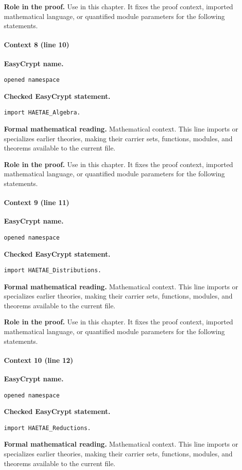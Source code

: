 \noindent\textbf{Role in the proof.}
Use in this chapter. It fixes the proof context, imported mathematical language, or quantified module parameters for the following statements.

\paragraph{Context 8 (line 10)}
\noindent\textbf{EasyCrypt name.}
\begin{lstlisting}[language=EasyCrypt,basicstyle=\ttfamily\scriptsize]
opened namespace
\end{lstlisting}
\noindent\textbf{Checked EasyCrypt statement.}
\begin{lstlisting}[language=EasyCrypt,basicstyle=\ttfamily\scriptsize]
import HAETAE_Algebra.
\end{lstlisting}
\noindent\textbf{Formal mathematical reading.}
Mathematical context. This line imports or specializes earlier theories, making their carrier sets, functions, modules, and theorems available to the current file.

\noindent\textbf{Role in the proof.}
Use in this chapter. It fixes the proof context, imported mathematical language, or quantified module parameters for the following statements.

\paragraph{Context 9 (line 11)}
\noindent\textbf{EasyCrypt name.}
\begin{lstlisting}[language=EasyCrypt,basicstyle=\ttfamily\scriptsize]
opened namespace
\end{lstlisting}
\noindent\textbf{Checked EasyCrypt statement.}
\begin{lstlisting}[language=EasyCrypt,basicstyle=\ttfamily\scriptsize]
import HAETAE_Distributions.
\end{lstlisting}
\noindent\textbf{Formal mathematical reading.}
Mathematical context. This line imports or specializes earlier theories, making their carrier sets, functions, modules, and theorems available to the current file.

\noindent\textbf{Role in the proof.}
Use in this chapter. It fixes the proof context, imported mathematical language, or quantified module parameters for the following statements.

\paragraph{Context 10 (line 12)}
\noindent\textbf{EasyCrypt name.}
\begin{lstlisting}[language=EasyCrypt,basicstyle=\ttfamily\scriptsize]
opened namespace
\end{lstlisting}
\noindent\textbf{Checked EasyCrypt statement.}
\begin{lstlisting}[language=EasyCrypt,basicstyle=\ttfamily\scriptsize]
import HAETAE_Reductions.
\end{lstlisting}
\noindent\textbf{Formal mathematical reading.}
Mathematical context. This line imports or specializes earlier theories, making their carrier sets, functions, modules, and theorems available to the current file.

